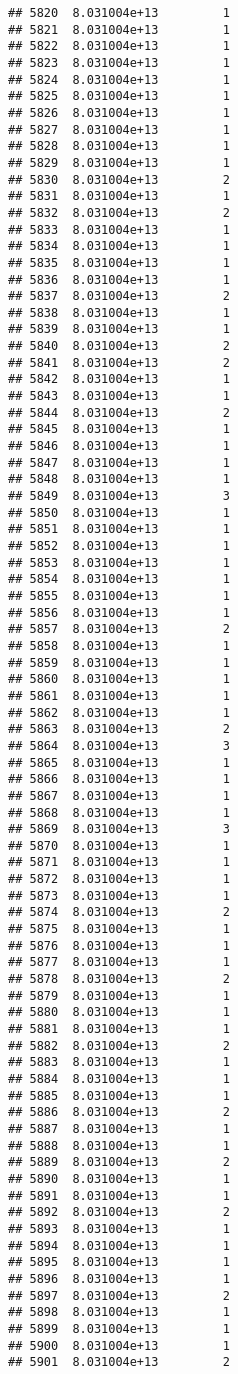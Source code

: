 \documentclass[
]{article}
\begin{document}
\begin{verbatim}
## 5820  8.031004e+13         1
## 5821  8.031004e+13         1
## 5822  8.031004e+13         1
## 5823  8.031004e+13         1
## 5824  8.031004e+13         1
## 5825  8.031004e+13         1
## 5826  8.031004e+13         1
## 5827  8.031004e+13         1
## 5828  8.031004e+13         1
## 5829  8.031004e+13         1
## 5830  8.031004e+13         2
## 5831  8.031004e+13         1
## 5832  8.031004e+13         2
## 5833  8.031004e+13         1
## 5834  8.031004e+13         1
## 5835  8.031004e+13         1
## 5836  8.031004e+13         1
## 5837  8.031004e+13         2
## 5838  8.031004e+13         1
## 5839  8.031004e+13         1
## 5840  8.031004e+13         2
## 5841  8.031004e+13         2
## 5842  8.031004e+13         1
## 5843  8.031004e+13         1
## 5844  8.031004e+13         2
## 5845  8.031004e+13         1
## 5846  8.031004e+13         1
## 5847  8.031004e+13         1
## 5848  8.031004e+13         1
## 5849  8.031004e+13         3
## 5850  8.031004e+13         1
## 5851  8.031004e+13         1
## 5852  8.031004e+13         1
## 5853  8.031004e+13         1
## 5854  8.031004e+13         1
## 5855  8.031004e+13         1
## 5856  8.031004e+13         1
## 5857  8.031004e+13         2
## 5858  8.031004e+13         1
## 5859  8.031004e+13         1
## 5860  8.031004e+13         1
## 5861  8.031004e+13         1
## 5862  8.031004e+13         1
## 5863  8.031004e+13         2
## 5864  8.031004e+13         3
## 5865  8.031004e+13         1
## 5866  8.031004e+13         1
## 5867  8.031004e+13         1
## 5868  8.031004e+13         1
## 5869  8.031004e+13         3
## 5870  8.031004e+13         1
## 5871  8.031004e+13         1
## 5872  8.031004e+13         1
## 5873  8.031004e+13         1
## 5874  8.031004e+13         2
## 5875  8.031004e+13         1
## 5876  8.031004e+13         1
## 5877  8.031004e+13         1
## 5878  8.031004e+13         2
## 5879  8.031004e+13         1
## 5880  8.031004e+13         1
## 5881  8.031004e+13         1
## 5882  8.031004e+13         2
## 5883  8.031004e+13         1
## 5884  8.031004e+13         1
## 5885  8.031004e+13         1
## 5886  8.031004e+13         2
## 5887  8.031004e+13         1
## 5888  8.031004e+13         1
## 5889  8.031004e+13         2
## 5890  8.031004e+13         1
## 5891  8.031004e+13         1
## 5892  8.031004e+13         2
## 5893  8.031004e+13         1
## 5894  8.031004e+13         1
## 5895  8.031004e+13         1
## 5896  8.031004e+13         1
## 5897  8.031004e+13         2
## 5898  8.031004e+13         1
## 5899  8.031004e+13         1
## 5900  8.031004e+13         1
## 5901  8.031004e+13         2

\end{verbatim}
\end{document}
